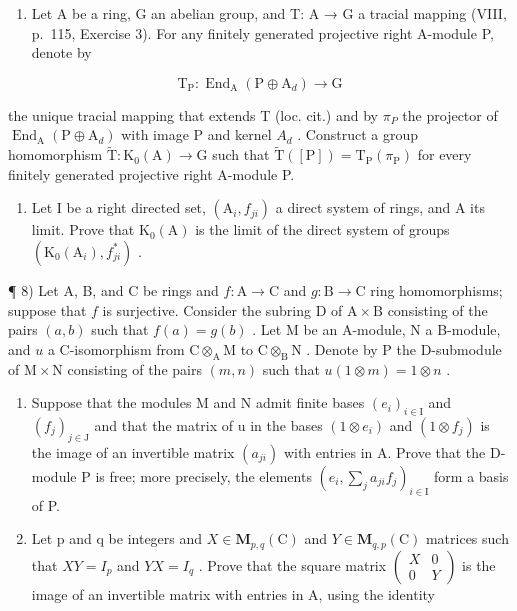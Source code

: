 \begin{enumerate}
\def\labelenumi{\arabic{enumi})}
\setcounter{enumi}{5}
\tightlist
\item
  Let A be a ring, G an abelian group, and T: A → G a tracial mapping (VIII, p.~115, Exercise 3). For any finitely generated projective right A-module P, denote by
\end{enumerate}

\[
\mathrm{T} _ {\mathrm{P}}: \operatorname{End} _ {\mathrm{A}} (\mathrm{P} \oplus \mathrm{A} _ {d}) \longrightarrow \mathrm{G}
\]

the unique tracial mapping that extends T (loc. cit.) and by \(\pi_{P}\) the projector of \(\operatorname{End}_{\mathrm{A}}(\mathrm{P} \oplus \mathrm{A}_{d})\) with image P and kernel \(A_{d}\) . Construct a group homomorphism \(\widetilde{\mathrm{T}} : \mathrm{K}_{0}(\mathrm{A}) \to \mathrm{G}\) such that \(\widetilde{\mathrm{T}}([\mathrm{P}]) = \mathrm{T}_{\mathrm{P}}(\pi_{\mathrm{P}})\) for every finitely generated projective right A-module P.

\begin{enumerate}
\def\labelenumi{\arabic{enumi})}
\setcounter{enumi}{6}
\tightlist
\item
  Let I be a right directed set, \((\mathrm{A}_{i}, f_{ji})\) a direct system of rings, and A its limit. Prove that \(\mathrm{K}_{0}(\mathrm{A})\) is the limit of the direct system of groups \((\mathrm{K}_{0}(\mathrm{A}_{i}), f_{ji}^{*})\) .
\end{enumerate}

¶ 8) Let A, B, and C be rings and \(f: \mathrm{A} \to \mathrm{C}\) and \(g: \mathrm{B} \to \mathrm{C}\) ring homomorphisms; suppose that \(f\) is surjective. Consider the subring D of \(\mathrm{A} \times \mathrm{B}\) consisting of the pairs \((a, b)\) such that \(f(a) = g(b)\) . Let M be an A-module, N a B-module, and \(u\) a C-isomorphism from \(\mathrm{C} \otimes_{\mathrm{A}} \mathrm{M}\) to \(\mathrm{C} \otimes_{\mathrm{B}} \mathrm{N}\) . Denote by P the D-submodule of \(\mathrm{M} \times \mathrm{N}\) consisting of the pairs \((m, n)\) such that \(u(1 \otimes m) = 1 \otimes n\) .

\begin{enumerate}
\def\labelenumi{\alph{enumi})}
\item
  Suppose that the modules M and N admit finite bases \((e_{i})_{i\in\mathrm{I}}\) and \((f_{j})_{j\in\mathrm{J}}\) and that the matrix of u in the bases \((1\otimes e_{i})\) and \((1\otimes f_{j})\) is the image of an invertible matrix \((a_{ji})\) with entries in A. Prove that the D-module P is free; more precisely, the elements \((e_{i},\sum_{j}a_{ji}f_{j})_{i\in\mathrm{I}}\) form a basis of P.
\item
  Let p and q be integers and \(X \in \mathbf{M}_{p,q}(\mathrm{C})\) and \(Y \in \mathbf{M}_{q,p}(\mathrm{C})\) matrices such that \(XY = I_{p}\) and \(YX = I_{q}\) . Prove that the square matrix \(\begin{pmatrix} X & 0 \\ 0 & Y \end{pmatrix}\) is the image of an invertible matrix with entries in A, using the identity
\end{enumerate}

